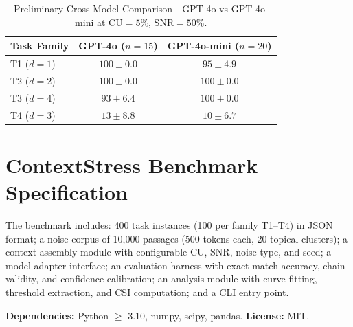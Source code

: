 \documentclass{article}
\begin{document}
\begin{table}[h]
\centering
\small
\caption{Preliminary Cross-Model Comparison---GPT-4o vs GPT-4o-mini at CU${=}5\%$, SNR${=}50\%$.}
\label{tab:cross_model}
\begin{tabular}{@{}lcc@{}}
\toprule
Task Family & GPT-4o ($n{=}15$) & GPT-4o-mini ($n{=}20$) \\
\midrule
T1 ($d{=}1$) & $100 \pm 0.0$ & $95 \pm 4.9$ \\
T2 ($d{=}2$) & $100 \pm 0.0$ & $100 \pm 0.0$ \\
T3 ($d{=}4$) & $93 \pm 6.4$ & $100 \pm 0.0$ \\
T4 ($d{=}3$) & $13 \pm 8.8$ & $10 \pm 6.7$ \\
\bottomrule
\end{tabular}
\end{table}

\section{ContextStress Benchmark Specification}
\label{app:benchmark}

The benchmark includes: 400 task instances (100 per family T1--T4) in JSON format; a noise corpus of 10,000 passages (500 tokens each, 20 topical clusters); a context assembly module with configurable CU, SNR, noise type, and seed; a model adapter interface; an evaluation harness with exact-match accuracy, chain validity, and confidence calibration; an analysis module with curve fitting, threshold extraction, and CSI computation; and a CLI entry point.

\textbf{Dependencies:} Python $\geq$ 3.10, numpy, scipy, pandas. \textbf{License:} MIT.
\end{document}
